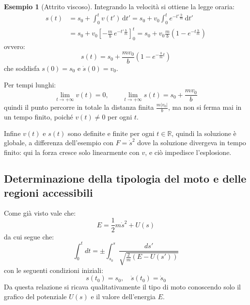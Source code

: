 \documentclass[11pt, a4paper, openright]{book}
\theoremstyle{plain}
\theoremstyle{definition}
\newtheorem{esempio}[teorema]{Esempio}
\theoremstyle{remark}
\begin{document}
\begin{esempio}[Attrito viscoso]
    Integrando la velocità si ottiene la legge oraria:
    \begin{align}
        s(t) &= s_0 + \int_{0}^{t} v(t')\, \mathrm{d}t' = s_0 + v_0 \int_{0}^{t} e^{-t'\frac{b}{m}}\, \mathrm{d}t' \\
        &= s_0 + v_0 \left[-\frac{m}{b}\, e^{-t'\frac{b}{m}}\right]_{0}^{t} = s_0 + v_0\frac{m}{b}\left(1 - e^{-t\frac{b}{m}}\right)
    \end{align}
    ovvero:
    \begin{equation}
        s(t) = s_0 + \frac{m v_0}{b}\left(1 - e^{-\frac{b}{m}t}\right)
    \end{equation}
    che soddisfa $s(0) = s_0$ e $\dot{s}(0) = v_0$.

    Per tempi lunghi:
    \begin{equation}
        \lim_{t \to +\infty} v(t) = 0, \qquad \lim_{t \to +\infty} s(t) = s_0 + \frac{m v_0}{b}
    \end{equation}
    quindi il punto percorre in totale la distanza finita $\frac{m|v_0|}{b}$, ma non si ferma mai in un tempo finito, poiché $v(t) \neq 0$ per ogni $t$.

    Infine $v(t)$ e $s(t)$ sono definite e finite per ogni $t \in \mathbb{R}$, quindi la soluzione è globale, a differenza dell'esempio con $F = \dot{s}^2$ dove la soluzione divergeva in tempo finito: qui la forza cresce solo linearmente con $v$, e ciò impedisce l'esplosione.
\end{esempio}

\subsection{Determinazione della tipologia del moto e delle regioni accessibili}
    Come già visto vale che:
    \begin{equation}
        E = \frac{1}{2}m\dot{s}^2 + U(s)
    \end{equation}
    da cui segue che:
    \begin{equation}
        \int_{0}^{t}dt = \pm \int_{s_0}^{s} \frac{ds'}{\sqrt{\frac{2}{m}(E - U(s'))}}
    \end{equation}
    con le seguenti condizioni iniziali:
    \begin{equation}
        s(t_0) = s_0, \quad \dot{s}(t_0) = \dot{s}_0
    \end{equation}
    Da questa relazione si ricava qualitativamente il tipo di moto conoscendo solo il grafico del potenziale $U(s)$ e il valore dell'energia $E$.
\end{document}
